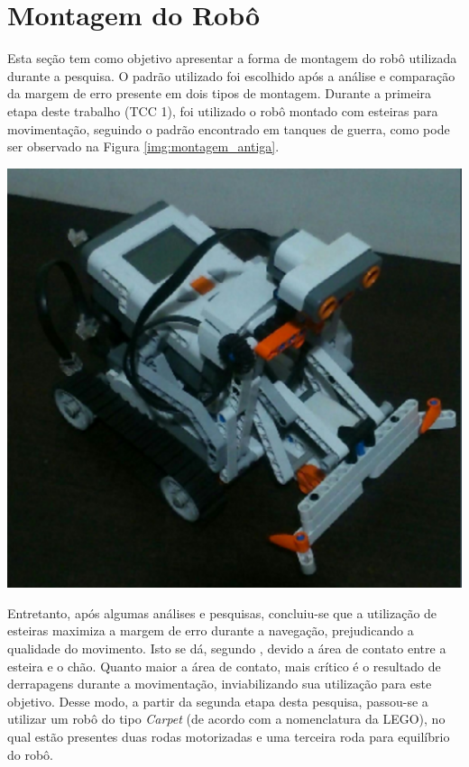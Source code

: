 \section{Montagem do Robô}
\label{sec:montagem_robo}

	Esta seção tem como objetivo apresentar a forma de montagem do robô utilizada durante a pesquisa. O padrão utilizado foi escolhido após a análise e comparação da margem de erro presente em dois tipos de montagem. Durante a primeira etapa deste trabalho (TCC 1), foi utilizado o robô montado com esteiras para movimentação, seguindo o padrão encontrado em tanques de guerra, como pode ser observado na Figura \ref{img:montagem_antiga}.

	{\centering
	\includegraphics[scale=0.4]{figuras/montagem_antiga.eps}
	\label{img:montagem_antiga}
	\par}

	Entretanto, após algumas análises e pesquisas, concluiu-se que a utilização de esteiras maximiza a margem de erro durante a navegação, prejudicando a qualidade do movimento. Isto se dá, segundo \cite{legonxj}, devido a área de contato entre a esteira e o chão. Quanto maior a área de contato, mais crítico é o resultado de derrapagens durante a movimentação, inviabilizando sua utilização para este objetivo. Desse modo, a partir da segunda etapa desta pesquisa, passou-se a utilizar um robô do tipo \textit{Carpet} (de acordo com a nomenclatura da LEGO), no qual estão presentes duas rodas motorizadas e uma terceira roda para equilíbrio do robô.

